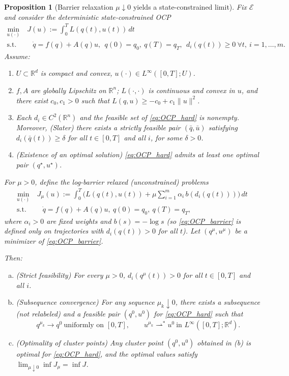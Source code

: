 \documentclass{article} %
\newtheorem{proposition}[theorem]{Proposition}
\begin{document}
\begin{proposition}[Barrier relaxation $\mu\downarrow 0$ yields a state-constrained limit]
\label{prop:barrier_to_state_constrained_complete}
Fix $\mathcal E$ and consider the deterministic state-constrained OCP
\begin{equation}
\begin{aligned}
\label{eq:OCP_hard}
\min_{u(\cdot)}&\ J(u):=\int_0^T L(q(t),u(t))\,dt\\
 \text{s.t.}&\quad 
\dot q=f(q)+A(q)u,\ \ q(0)=q_0,\ q(T)=q_T,\ \ d_i(q(t))\ge 0\ \forall t,\ i=1,\dots,m .
\end{aligned}
\end{equation}
Assume:
\begin{enumerate}[(H1)]
\item $U\subset\mathbb R^d$ is compact and convex, $u(\cdot)\in L^\infty([0,T];U)$.
\item $f,A$ are globally Lipschitz on $\mathbb R^n$; $L(\cdot,\cdot)$ is continuous and convex in $u$,
and there exist $c_0,c_1>0$ such that $L(q,u)\ge -c_0+c_1\|u\|^2$.
\item Each $d_i\in C^2(\mathbb R^n)$ and the feasible set of \cref{eq:OCP_hard} is nonempty.
Moreover, (\emph{Slater}) there exists a strictly feasible pair $(\bar q,\bar u)$ satisfying $d_i(\bar q(t))\ge \delta$
for all $t\in[0,T]$ and all $i$, for some $\delta>0$.
\item (\emph{Existence of an optimal solution}) \cref{eq:OCP_hard} admits at least one optimal pair $(q^\star,u^\star)$.
\end{enumerate}
For $\mu>0$, define the \emph{log-barrier relaxed} (unconstrained) problems
\begin{equation}
\begin{aligned}
\label{eq:OCP_barrier}
\min_{u(\cdot)}&\ J_\mu(u)
:=\int_0^T \Big( L(q(t),u(t)) + \mu\sum_{i=1}^m \alpha_i\,b(d_i(q(t)))\Big)\,dt \\
\text{s.t.}&\quad
\dot q=f(q)+A(q)u,\ q(0)=q_0,\ q(T)=q_T,
\end{aligned}
\end{equation}
where $\alpha_i>0$ are fixed weights and $b(s)=-\log s$ (so \cref{eq:OCP_barrier} is defined only on trajectories with
$d_i(q(t))>0$ for all $t$). Let $(q^\mu,u^\mu)$ be a minimizer of \cref{eq:OCP_barrier}.

Then:
\begin{enumerate}[(a)]
\item (\emph{Strict feasibility}) For every $\mu>0$, $d_i(q^\mu(t))>0$ for all $t\in[0,T]$ and all $i$.
\item (\emph{Subsequence convergence}) For any sequence $\mu_k\downarrow 0$, there exists a subsequence (not relabeled) and
a feasible pair $(q^0,u^0)$ for \cref{eq:OCP_hard} such that
\[
q^{\mu_k}\to q^0 \ \text{uniformly on }[0,T],
\qquad
u^{\mu_k}\rightharpoonup^\ast u^0 \ \text{in }L^\infty([0,T];\mathbb R^d).
\]
\item (\emph{Optimality of cluster points}) Any cluster point $(q^0,u^0)$ obtained in (b) is optimal for \cref{eq:OCP_hard}, and
the optimal values satisfy $\lim_{\mu\downarrow 0}\inf J_\mu = \inf J$.
\end{enumerate}


\end{proposition}
\end{document}
